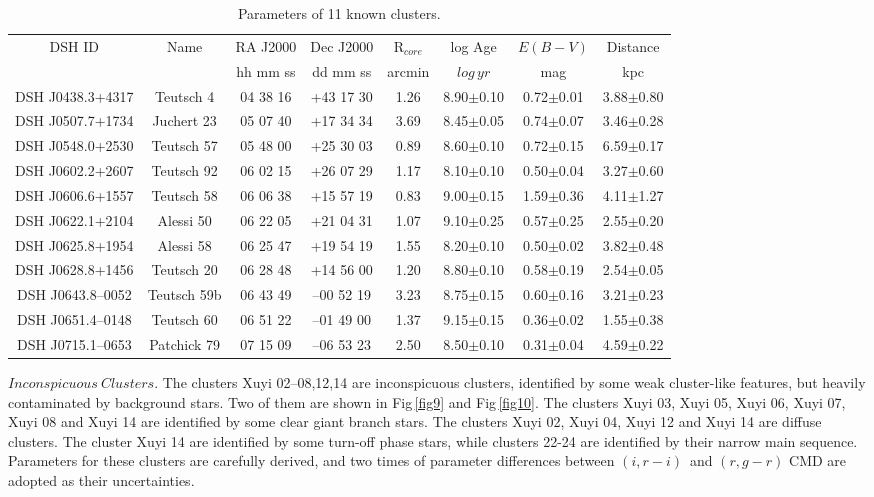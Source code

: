 \documentclass[]{raa_rb}
\begin{document}
\begin{table*}
\centering
\begin{minipage}{140mm}
\caption{Parameters of 11 known clusters.}
\label{clusters_kk}
\begin{tabular}{c|c|c|c|c|c|c|c}
\hline
\hline
  DSH ID          & Name        & RA J2000 & Dec J2000  &R$_{core}$& log Age           & $E(B-V)$      & Distance         \\ 
                  &             & hh mm ss &  dd mm ss  &arcmin& $log\,yr $       &  mag          & kpc              \\ \hline
DSH J0438.3+4317  & Teutsch 4   & 04 38 16 &  +43 17 30 & 1.26 & 8.90$\pm$0.10 & 0.72$\pm$0.01 &  3.88$\pm$0.80 \\
DSH J0507.7+1734  & Juchert 23  & 05 07 40 &  +17 34 34 & 3.69 & 8.45$\pm$0.05 & 0.74$\pm$0.07 &  3.46$\pm$0.28 \\
DSH J0548.0+2530  & Teutsch 57  & 05 48 00 &  +25 30 03 & 0.89 & 8.60$\pm$0.10 & 0.72$\pm$0.15 &  6.59$\pm$0.17 \\
DSH J0602.2+2607  & Teutsch 92  & 06 02 15 &  +26 07 29 & 1.17 & 8.10$\pm$0.10 & 0.50$\pm$0.04 &  3.27$\pm$0.60 \\
DSH J0606.6+1557  & Teutsch 58  & 06 06 38 &  +15 57 19 & 0.83 & 9.00$\pm$0.15 & 1.59$\pm$0.36 &  4.11$\pm$1.27 \\
DSH J0622.1+2104  & Alessi 50   & 06 22 05 &  +21 04 31 & 1.07 & 9.10$\pm$0.25 & 0.57$\pm$0.25 &  2.55$\pm$0.20 \\
DSH J0625.8+1954  & Alessi 58   & 06 25 47 &  +19 54 19 & 1.55 & 8.20$\pm$0.10 & 0.50$\pm$0.02 &  3.82$\pm$0.48 \\
DSH J0628.8+1456  & Teutsch 20  & 06 28 48 &  +14 56 00 & 1.20 & 8.80$\pm$0.10 & 0.58$\pm$0.19 &  2.54$\pm$0.05 \\
DSH J0643.8--0052 & Teutsch 59b & 06 43 49 & --00 52 19 & 3.23 & 8.75$\pm$0.15 & 0.60$\pm$0.16 &  3.21$\pm$0.23 \\
DSH J0651.4--0148 & Teutsch 60  & 06 51 22 & --01 49 00 & 1.37 & 9.15$\pm$0.15 & 0.36$\pm$0.02 &  1.55$\pm$0.38 \\
DSH J0715.1--0653 & Patchick 79 & 07 15 09 & --06 53 23 & 2.50 & 8.50$\pm$0.10 & 0.31$\pm$0.04 &  4.59$\pm$0.22 \\

\hline
\end{tabular}
\end{minipage}
\end{table*}


\vspace{3ex}
$Inconspicuous~Clusters.$ 
The clusters Xuyi 02--08,12,14 are inconspicuous clusters, identified by some weak cluster-like features, but heavily contaminated by background stars. Two of them are shown in Fig\,\ref{fig9} and Fig\,\ref{fig10}. The clusters Xuyi 03, Xuyi 05, Xuyi 06, Xuyi 07, Xuyi 08 and Xuyi 14 are identified by some clear giant branch stars.
The clusters Xuyi 02, Xuyi 04, Xuyi 12 and Xuyi 14 are diffuse clusters. The cluster Xuyi 14
are identified by some turn-off phase stars, while clusters 22-24
are identified by their narrow main sequence. Parameters for these clusters are 
carefully derived, and two times of parameter differences between $(i, r-i)$~and $(r, g-r)$ CMD are adopted as their uncertainties.
\end{document}
